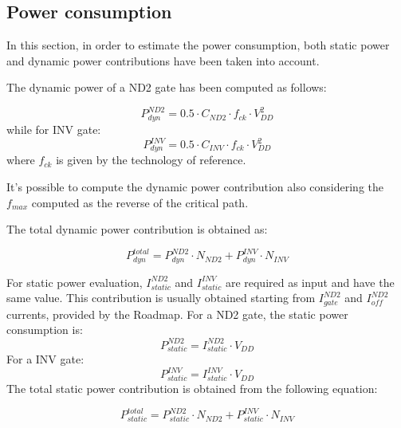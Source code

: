 \subsection{Power consumption}
In this section, in order to estimate the power consumption, both static power and  dynamic power contributions have been taken into account.

The dynamic power of a ND2 gate has been computed as follows:

\begin{equation}
P_{dyn}^{ND2}=0.5\cdot C_{ND2}\cdot f_{ck}\cdot V_{DD}^2
\end{equation}
while for INV gate:
\begin{equation}
P_{dyn}^{INV}=0.5\cdot C_{\textit{INV}}\cdot f_{ck}\cdot V_{DD}^2
\end{equation}
where $f_{ck}$ is given by the technology of reference.

It's possible to compute the dynamic power contribution also considering the $f_{max}$ computed as the reverse of the critical path.

The total dynamic power contribution is obtained as:

\begin{equation}
P_{dyn}^{total}=P_{dyn}^{ND2}\cdot N_{ND2}+P_{dyn}^{INV}\cdot N_{INV}
\end{equation}

For static power evaluation, $I_{static}^{ND2}$ and $I_{static}^{INV}$ are required as input and have the same value. This contribution is usually obtained starting from $I_{gate}^{ND2}$ and $I_{off}^{ND2}$ currents, provided by the Roadmap. 
For a ND2 gate, the static power consumption is:
\begin{equation}
P_{static}^{ND2}=I_{static}^{ND2}\cdot V_{DD}
\end{equation}
For a INV gate:
\begin{equation}
P_{static}^{INV}=I_{static}^{INV}\cdot V_{DD}
\end{equation}
The total static power contribution is obtained from the following equation:

\begin{equation}
P_{static}^{total}=P_{static}^{ND2}\cdot N_{ND2}+P_{static}^{INV}\cdot N_{INV}
\end{equation}